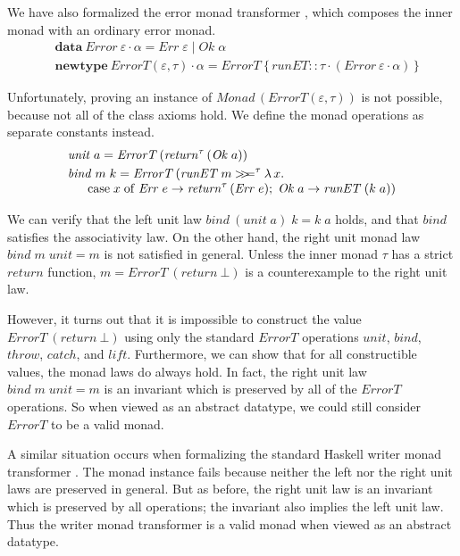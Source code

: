 \documentclass{sigplanconf}
\newcommand{\hsbind}{\mathbin{>\mkern-6mu>\mkern-6.5mu=}}
\newcommand{\kwd}[1]{\mathbf{#1}}
\newcommand{\hsc}[1]{\ensuremath{\mathit{#1}}}
\newcommand{\runET}{\hsc{runET}}
\newcommand{\tA}{\alpha}
\newcommand{\tE}{\varepsilon}
\newcommand{\tT}{\tau}
\theoremstyle{definition}
\begin{document}
We have also formalized the error monad transformer \cite{Jones1995}, which composes the inner monad with an ordinary error monad.
%
\begin{align*}
& \kwd{data}\:\hsc{Error}\:\tE\cdot\tA = \hsc{Err}\;\tE \mid \hsc{Ok}\;\tA \\
& \kwd{newtype}\:\hsc{ErrorT}(\tE,\tT)\cdot\tA = \hsc{ErrorT}\:\{\,\runET :: \tT\cdot(\hsc{Error}\:\tE\cdot\tA)\,\}
\end{align*}

Unfortunately, proving an instance of $\hsc{Monad}\,(\hsc{ErrorT}(\tE,\tT))$ is not possible, because not all of the class axioms hold. We define the monad operations as separate constants instead.
%
\begin{align*}
& \hsc{unit}\;a = \hsc{ErrorT}\,(\hsc{return}^\tT\,(\hsc{Ok}\;a)) \\
& \hsc{bind}\;m\;k = \hsc{ErrorT}\,(\runET\:m \hsbind^\tT \lambda\,{x}. \\[-\jot]
& \hspace{16pt} \mathrm{case}\;x\;\mathrm{of}\;\hsc{Err}\;e \to \hsc{return}^\tT\,(\hsc{Err}\;e);\; \hsc{Ok}\;a \to \runET\:(k\;a))
\end{align*}

We can verify that the left unit law $\hsc{bind}\:(\hsc{unit}\;a)\;k = k\;a$ holds, and that \hsc{bind} satisfies the associativity law. On the other hand, the right unit monad law $\hsc{bind}\;m\;\hsc{unit} = m$ is not satisfied in general. Unless the inner monad $\tT$ has a strict \hsc{return} function, $m = \hsc{ErrorT}\:(\hsc{return}\:\bot)$ is a counterexample to the right unit law.

However, it turns out that it is impossible to construct the value $\hsc{ErrorT}\:(\hsc{return}\:\bot)$ using only the standard \hsc{ErrorT} operations \hsc{unit}, \hsc{bind}, \hsc{throw}, \hsc{catch}, and \hsc{lift}. Furthermore, we can show that for all constructible values, the monad laws do always hold. In fact, the right unit law $\hsc{bind}\;m\;\hsc{unit} = m$ is an invariant which is preserved by all of the \hsc{ErrorT} operations. So when viewed as an abstract datatype, we could still consider \hsc{ErrorT} to be a valid monad.

A similar situation occurs when formalizing the standard Haskell writer monad transformer \cite{Jones1995}. The monad instance fails because neither the left nor the right unit laws are preserved in general. But as before, the right unit law is an invariant which is preserved by all operations; the invariant also implies the left unit law. Thus the writer monad transformer is a valid monad when viewed as an abstract datatype.
\end{document}
